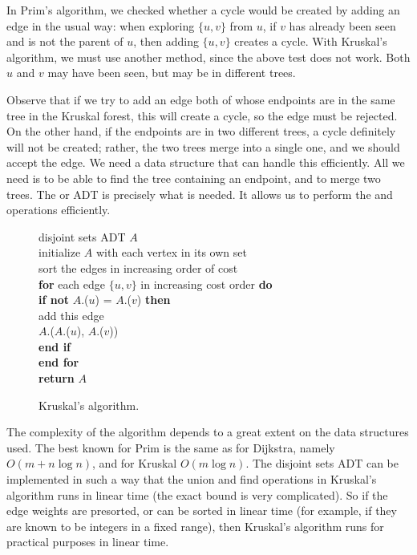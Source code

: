 In Prim's algorithm, we checked whether a cycle would be created by adding
an edge in the usual way: when exploring $\{u, v\}$ from $u$, if $v$ has
already been seen and is not the parent of $u$, then adding $\{u, v\}$
creates a cycle. With Kruskal's algorithm, we must use another method,
since the above test does not work. Both $u$ and $v$ may have been seen,
but may be in different trees.

Observe that if we try to add an edge both of whose endpoints are in
the same tree in the Kruskal forest, this will create a cycle, so the
edge must be rejected. On the other hand, if the endpoints are in two
different trees, a cycle definitely will not be created; rather, the two
trees merge into a single one, and we should accept the edge. We need
a data structure that can handle this efficiently. All we need is to be
able to find the tree containing an endpoint, and to merge two trees. The
 or  ADT is precisely what
is needed. It allows us to perform the  and 
operations efficiently. %

\begin{figure}
\hspace*{1in}\begin{minipage}{5in}
{
\> disjoint sets ADT $A$ \\
\> initialize $A$ with each vertex in its own set \\
\> sort the edges in increasing order of cost \\
\> \textbf{for} each edge $\{u, v\}$ in increasing cost order \textbf{do}\\
\> \> \textbf{if not } $A$.($u$) = $A$.($v$) \textbf{then} \\
\> \> \>  add this edge \\
\> \> \> $A$.($A$.($u$), $A$.($v$)) \\
\> \> \textbf{end if} \\
\> \textbf{end for} \\
\> \textbf{return} $A$ \\
}
\end{minipage}
\caption{Kruskal's algorithm.}
\label{fig:Kruskal-alg}
\end{figure}

The complexity of the algorithm depends to a great extent on the data
structures used. The best known for Prim is the same as for Dijkstra,
namely $O(m + n\log n)$, and for Kruskal $O(m \log n)$. The disjoint sets
ADT can be implemented in such a way that the union and find operations
in Kruskal's algorithm runs in  linear time (the exact bound
is very complicated). So if the edge weights are presorted, or can be
sorted in linear time (for example, if they are known to be integers in
a fixed range), then Kruskal's algorithm runs for practical purposes in
linear time.


